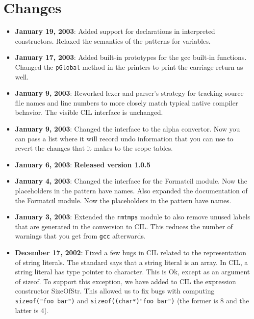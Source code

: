 \documentclass{article}
\def\t#1{{\tt #1}}
\begin{document}
\section{Changes}\label{sec-changes}
\begin{itemize}
\item {\bf January 19, 2003}: Added support for declarations in interpreted
  constructors. Relaxed the semantics of the patterns for variables. 
\item {\bf January 17, 2003}: Added built-in prototypes for the gcc built-in
  functions. Changed the \t{pGlobal} method in the printers to print the
  carriage return as well.
\item {\bf January 9, 2003}: Reworked lexer and parser's strategy for
  tracking source file names and line numbers to more closely match
  typical native compiler behavior.  The visible CIL interface is
  unchanged.
\item {\bf January 9, 2003}: Changed the interface to the alpha convertor. Now
you can pass a list where it will record undo information that you can use to
revert the changes that it makes to the scope tables.
\item {\bf January 6, 2003}: {\bf Released version 1.0.5}
\item {\bf January 4, 2003}: Changed the interface for the Formatcil module.
  Now the placeholders in the pattern have names. Also expanded the
  documentation of the Formatcil module.
  Now the placeholders in the pattern have names.
\item {\bf January 3, 2003}: Extended the \t{rmtmps} module to also remove
  unused labels that are generated in the conversion to CIL. This reduces the
  number of warnings that you get from \t{gcc} afterwards.
\item {\bf December 17, 2002}: Fixed a few bugs in CIL related to the
  representation of string literals. The standard says that a string literal
  is an array. In CIL, a string literal has type pointer to character. This is
  Ok, except as an argument of sizeof. To support this exception, we have
  added to CIL the expression constructor SizeOfStr. This allowed us to fix
  bugs with computing \t{sizeof("foo bar")} and \t{sizeof((char*)"foo bar")}
  (the former is 8 and the latter is 4).


\end{itemize}
\end{document}
